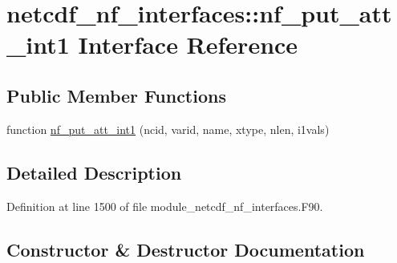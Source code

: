 \hypertarget{interfacenetcdf__nf__interfaces_1_1nf__put__att__int1}{}\section{netcdf\+\_\+nf\+\_\+interfaces\+:\+:nf\+\_\+put\+\_\+att\+\_\+int1 Interface Reference}
\label{interfacenetcdf__nf__interfaces_1_1nf__put__att__int1}
\subsection*{Public Member Functions}
\begin{DoxyCompactItemize}
\item 
function \hyperlink{interfacenetcdf__nf__interfaces_1_1nf__put__att__int1_a50e554b571f0486af081040a521764e6}{nf\+\_\+put\+\_\+att\+\_\+int1} (ncid, varid, name, xtype, nlen, i1vals)
\end{DoxyCompactItemize}


\subsection{Detailed Description}


Definition at line 1500 of file module\+\_\+netcdf\+\_\+nf\+\_\+interfaces.\+F90.



\subsection{Constructor \& Destructor Documentation}
\mbox{\label{interfacenetcdf__nf__interfaces_1_1nf__put__att__int1_a50e554b571f0486af081040a521764e6}} 
